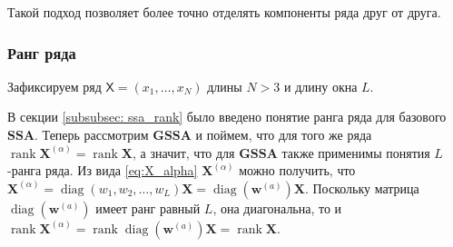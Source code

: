 \documentclass[a4paper, 11pt]{article}
\newcommand{\SSA}{\textbf{SSA}}
\newcommand{\GSSA}{\textbf{GSSA}}
\newcommand{\TS}{\mathsf{X}}
\begin{document}
Такой подход позволяет более точно отделять компоненты ряда друг от друга.


\subsubsection{Ранг ряда}
Зафиксируем ряд $\TS = (x_1, \dots, x_{N})$ длины $N > 3$ и длину окна $L$.


В секции \ref{subsubsec: ssa_rank} было введено понятие ранга ряда для базового $\SSA$.
Теперь рассмотрим $\GSSA$ и поймем, что для того же ряда $\operatorname{rank} \mathbf{X}^{(\alpha)} = \operatorname{rank} \mathbf{X}$, а значит, что для $\GSSA$ также применимы понятия $L$-ранга ряда. Из вида \eqref{eq:X_alpha} $\mathbf{X}^{(\alpha)}$ можно получить, что $\mathbf{X}^{(\alpha)} = \operatorname{diag}\left(w_1, w_2, \dots, w_L \right) \mathbf{X} = \operatorname{diag}\left({\boldsymbol{w}}^{(a)}\right) \mathbf{X}$. Поскольку матрица $\operatorname{diag}\left({\boldsymbol{w}}^{(a)}\right)$ имеет ранг равный $L$, она диагональна, то и $\operatorname{rank} \mathbf{X}^{(\alpha)} = \operatorname{rank} \operatorname{diag}\left({\boldsymbol{w}}^{(a)}\right)\mathbf{X} = \operatorname{rank} \mathbf{X}$.
\end{document}
